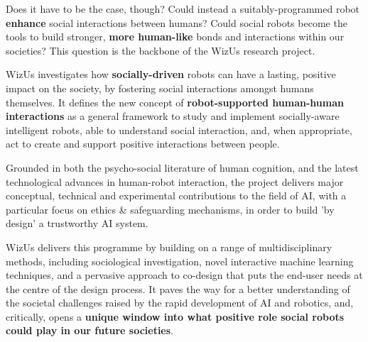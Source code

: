 \documentclass[11pt,a4paper]{report}
\newcommand{\project}{WizUs\xspace}
\begin{document}
Does it have to be the case, though? Could instead a suitably-programmed robot
\textbf{enhance} social interactions between humans? Could social robots become
the tools to build stronger, \textbf{more human-like} bonds and
interactions within our societies? This question is the backbone of
the \project research project.

\project investigates how \textbf{socially-driven} robots can have a lasting, positive
impact on the society, by fostering social interactions amongst humans
themselves. It defines the new concept of \textbf{robot-supported human-human
interactions} as a general framework to study and implement socially-aware
intelligent robots, able to understand social interaction, and, when
appropriate, act to create and support positive interactions between people.

Grounded in both the psycho-social literature of human cognition, and the latest
technological advances in human-robot interaction, the project delivers
major conceptual, technical and experimental contributions to the field of AI, 
with a particular focus on ethics \& safeguarding mechanisms, in order to build 'by 
design' a trustworthy AI system.

\project delivers this programme by building on a range of multidisciplinary
methods, including sociological investigation, novel interactive machine
learning techniques, and a pervasive approach to co-design that puts the
end-user needs at the centre of the design process. It paves the way for a
better understanding of the societal challenges raised by the rapid development
of AI and robotics, and, critically, opens a \textbf{unique window into what
positive role social robots could play in our future societies}.

\newpage

\tableofcontents

\pagebreak


\newcommand{\wpOne}{Framing robot-supported human-human interaction}
\newcommand{\wpOneShort}{Framing r-HHI}


\newcommand{\wpTwo}{Real-world Social Situation Assessment}
\newcommand{\wpTwoShort}{Social Situation Assessment}
\end{document}
